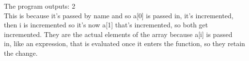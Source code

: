 \documentclass[12pt]{article}
\begin{document}
\begin{flushleft}
\qquad \qquad \qquad \qquad The program outputs: { 2 }\\
[2mm] 
\qquad \qquad \qquad \qquad This is because it's passed by name and so {\selectfont a[0]} is passed in, it's incremented,\\
\qquad \qquad \qquad \qquad then {\selectfont i} is incremented so it's now {\selectfont a[1]} that's incremented, so both get\\
\qquad \qquad \qquad \qquad incremented.  They are the actual elements of the array because {\selectfont a[i]} is passed\\
\qquad \qquad \qquad \qquad in, like an expression, that is evaluated once it enters the function, so they retain\\
\qquad \qquad \qquad \qquad the change.\\


\end{flushleft}
\end{document}
